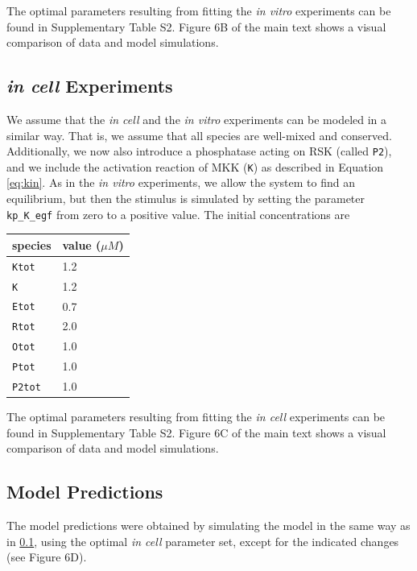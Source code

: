 \documentclass[12pt]{article}
\begin{document}
	The optimal parameters resulting from fitting the \emph{in vitro}
	experiments can be found in Supplementary Table S2. Figure 6B of the
	main text shows a visual comparison of data and model simulations.
	
	\subsection{\textit{in cell} Experiments}
	
	\label{ss:incell} We assume that the \textit{in cell} and the \textit{in
		vitro} experiments can be modeled in a similar way. That is, we assume
	that all species are well-mixed and conserved. Additionally, we now
	also introduce a phosphatase acting on RSK (called \texttt{P2}),
	and we include the activation reaction of MKK (\texttt{K}) as described
	in Equation \eqref{eq:kin}. As in the \textit{in vitro} experiments,
	we allow the system to find an equilibrium, but then the stimulus
	is simulated by setting the parameter \texttt{kp\_K\_egf}
	from zero to a positive value. The initial concentrations are 
	\begin{center}
		\begin{tabular}{ll}
			species  & value ($\mu M$)\\
			\midrule 
			\texttt{Ktot}  & 1.2\\
			\texttt{K}  & 1.2 \\
			\texttt{Etot}  & 0.7\\
			\texttt{Rtot}  & 2.0\\			
			\texttt{Otot}  & 1.0\\
			\texttt{Ptot}  & 1.0\\
			\texttt{P2tot}  & 1.0\\
		\end{tabular}
		\par\end{center}
	
	The optimal parameters resulting from fitting the \emph{in cell} experiments can be found in Supplementary Table S2. Figure 6C of the main text shows a visual comparison of data and model simulations.
	
	\subsection{Model Predictions}
	
	The model predictions were obtained by simulating the model in the
	same way as in \ref{ss:incell}, using the optimal \emph{in cell}
	parameter set, except for the indicated changes (see Figure 6D).
	
\end{document}
